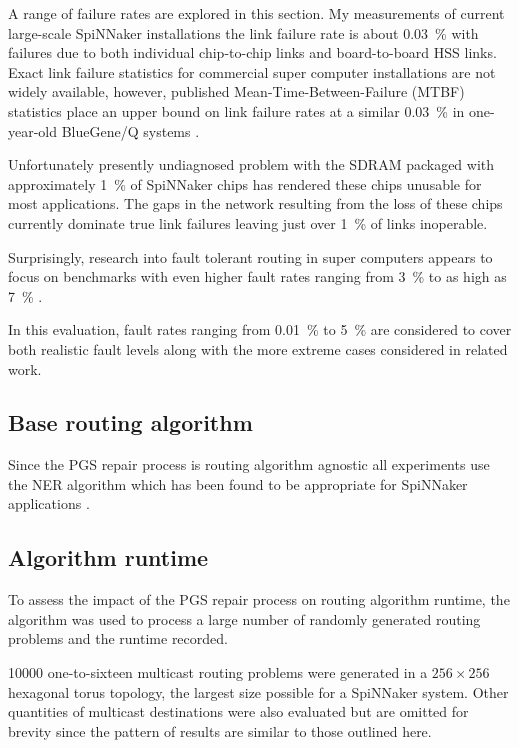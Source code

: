 			A range of failure rates are explored in this section. My measurements of
			current large-scale SpiNNaker installations the link failure rate is about
			\SI{0.03}{\percent} with failures due to both individual chip-to-chip links
			and board-to-board HSS links. Exact link failure statistics for commercial
			super computer installations are not widely available, however, published
			Mean-Time-Between-Failure (MTBF) statistics place an upper bound on link
			failure rates at a similar \SI{0.03}{\percent} in one-year-old BlueGene/Q
			systems \cite{chiu11}.
			
			Unfortunately presently undiagnosed problem with the SDRAM packaged with
			approximately \SI{1}{\percent} of SpiNNaker chips has rendered these chips
			unusable for most applications. The gaps in the network resulting from the
			loss of these chips currently dominate true link failures leaving just over
			\SI{1}{\percent} of links inoperable.
			
			Surprisingly, research into fault tolerant routing in super computers
			appears to focus on benchmarks with even higher fault rates ranging from
			\SI{3}{\percent} to as high as \SI{7}{\percent}
			\cite{ho04,gomez04,mejia06}.
			
			In this evaluation, fault rates ranging from \SI{0.01}{\percent} to
			\SI{5}{\percent} are considered to cover both realistic fault levels
			along with the more extreme cases considered in related work.
		
		\subsection{Base routing algorithm}
			
			Since the PGS repair process is routing algorithm agnostic all
			experiments use the NER algorithm which has been found to be appropriate
			for SpiNNaker applications \cite{navaridas14}.
		
		\subsection{Algorithm runtime}
			
			To assess the impact of the PGS repair process on routing algorithm
			runtime, the algorithm was used to process a large number of randomly
			generated routing problems and the runtime recorded.
			
			\num{10000} one-to-sixteen multicast routing problems were generated in a
			$256\times256$ hexagonal torus topology, the largest size possible for a
			SpiNNaker system. Other quantities of multicast destinations were also
			evaluated but are omitted for brevity since the pattern of results are
			similar to those outlined here.
			
